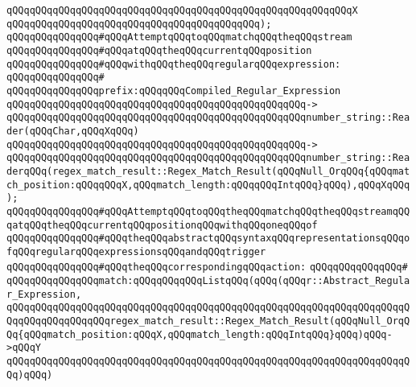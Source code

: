 \verb|qQQqqQQqqQQqqQQqqQQqqQQqqQQqqQQqqQQqqQQqqQQqqQQqqQQqqQQqqQQqX|\newline
\verb|qQQqqQQqqQQqqQQqqQQqqQQqqQQqqQQqqQQqqQQqqQQq);|\newline
\newline
\verb|qQQqqQQqqQQqqQQq#qQQqAttemptqQQqtoqQQqmatchqQQqtheqQQqstream|\newline
\verb|qQQqqQQqqQQqqQQq#qQQqatqQQqtheqQQqcurrentqQQqposition|\newline
\verb|qQQqqQQqqQQqqQQq#qQQqwithqQQqtheqQQqregularqQQqexpression:|\newline
\verb|qQQqqQQqqQQqqQQq#|\newline
\verb|qQQqqQQqqQQqqQQqprefix:qQQqqQQqCompiled_Regular_Expression|\newline
\verb|qQQqqQQqqQQqqQQqqQQqqQQqqQQqqQQqqQQqqQQqqQQqqQQqqQQq->|\newline
\verb|qQQqqQQqqQQqqQQqqQQqqQQqqQQqqQQqqQQqqQQqqQQqqQQqqQQqnumber_string::Reader(qQQqChar,qQQqXqQQq)|\newline
\verb|qQQqqQQqqQQqqQQqqQQqqQQqqQQqqQQqqQQqqQQqqQQqqQQqqQQq->|\newline
\verb|qQQqqQQqqQQqqQQqqQQqqQQqqQQqqQQqqQQqqQQqqQQqqQQqqQQqnumber_string::ReaderqQQq(regex_match_result::Regex_Match_Result(qQQqNull_OrqQQq{qQQqmatch_position:qQQqqQQqX,qQQqmatch_length:qQQqqQQqIntqQQq}qQQq),qQQqXqQQq);|\newline
\newline
\newline
\newline
\verb|qQQqqQQqqQQqqQQq#qQQqAttemptqQQqtoqQQqtheqQQqmatchqQQqtheqQQqstreamqQQqatqQQqtheqQQqcurrentqQQqpositionqQQqwithqQQqoneqQQqof|\newline
\verb|qQQqqQQqqQQqqQQq#qQQqtheqQQqabstractqQQqsyntaxqQQqrepresentationsqQQqofqQQqregularqQQqexpressionsqQQqandqQQqtrigger|\newline
\verb|qQQqqQQqqQQqqQQq#qQQqtheqQQqcorrespondingqQQqaction:|\newline
\verb|qQQqqQQqqQQqqQQq#|\newline
\verb|qQQqqQQqqQQqqQQqmatch:qQQqqQQqqQQqListqQQq(qQQq(qQQqr::Abstract_Regular_Expression,|\newline
\verb|qQQqqQQqqQQqqQQqqQQqqQQqqQQqqQQqqQQqqQQqqQQqqQQqqQQqqQQqqQQqqQQqqQQqqQQqqQQqqQQqqQQqqQQqregex_match_result::Regex_Match_Result(qQQqNull_OrqQQq{qQQqmatch_position:qQQqX,qQQqmatch_length:qQQqIntqQQq}qQQq)qQQq->qQQqY|\newline
\verb|qQQqqQQqqQQqqQQqqQQqqQQqqQQqqQQqqQQqqQQqqQQqqQQqqQQqqQQqqQQqqQQqqQQqqQQq)qQQq)|\newline
